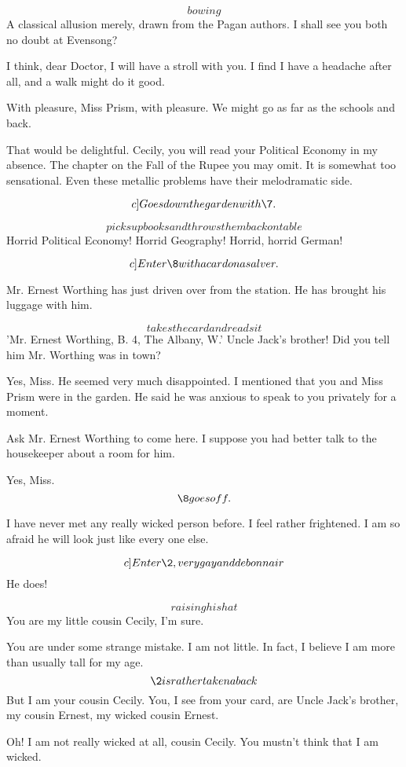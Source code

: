 \documentclass{book}
\begin{document}
\7  \[bowing\]  A classical allusion merely, drawn from the
Pagan authors.  I shall see you both no doubt at Evensong?

\6  I think, dear Doctor, I will have a stroll with you.
I find I have a headache after all, and a walk might do it good.

\7  With pleasure, Miss Prism, with pleasure.  We might go
as far as the schools and back.

\6  That would be delightful.  Cecily, you will read your
Political Economy in my absence.  The chapter on the Fall of the
Rupee you may omit.  It is somewhat too sensational.  Even these
metallic problems have their melodramatic side.

\[c]Goes down the garden with \7.\]

\5  \[picks up books and throws them back on table\]  Horrid
Political Economy!  Horrid Geography!  Horrid, horrid German!

\[c]Enter \8 with a card on a salver.\]

\8 Mr. Ernest Worthing has just driven over from the
station.  He has brought his luggage with him.

\5  \[takes the card and reads it\]  'Mr. Ernest Worthing, B.
4, The Albany, W.'  Uncle Jack's brother!  Did you tell him Mr.
Worthing was in town?

\8 Yes, Miss.  He seemed very much disappointed.  I
mentioned that you and Miss Prism were in the garden.  He said he
was anxious to speak to you privately for a moment.

\5  Ask Mr. Ernest Worthing to come here.  I suppose you had
better talk to the housekeeper about a room for him.

\8  Yes, Miss. \[\8 goes off.\]


\5  I have never met any really wicked person before.  I feel
rather frightened.  I am so afraid he will look just like every one
else.

\[c]Enter \2, very gay and debonnair\] 
He does!

\2 \[raising his hat\]  You are my little cousin Cecily, I'm
sure.

\5  You are under some strange mistake.  I am not little.  In
fact, I believe I am more than usually tall for my age.  \[\2
is rather taken aback\]  But I am your cousin Cecily.  You, I see
from your card, are Uncle Jack's brother, my cousin Ernest, my
wicked cousin Ernest.

\2  Oh! I am not really wicked at all, cousin Cecily.  You
mustn't think that I am wicked.
\end{document}
